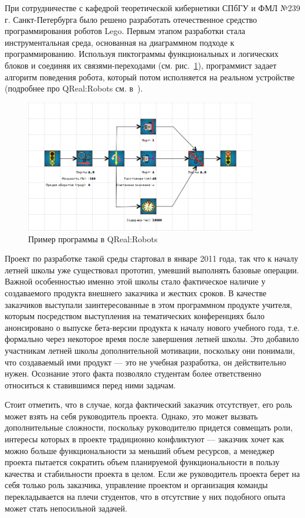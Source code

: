 \documentclass[a4paper]{article}
\begin{document}
При сотрудничестве с кафедрой теоретической кибернетики СПбГУ и ФМЛ №239 г. Санкт-Петербурга было решено разработать отечественное средство программирования роботов Lego. Первым этапом разработки стала инструментальная среда, основанная на диаграммном подходе к программированию. Используя пиктограммы функциональных и логических блоков и соединяя их связями-переходами (см. рис.~\ref{qreal-robots}), программист задает алгоритм поведения робота, который потом исполняется на реальном устройстве (подробнее про QReal:Robots см. в~\cite{robots}).

\begin{figure} [ht]
  \begin{center}
    \includegraphics[width=0.9\textwidth]{02-qreal-robots.png}
    \caption{Пример программы в QReal:Robots}
    \label{qreal-robots}
  \end{center}
\end{figure}

Проект по разработке такой среды стартовал в январе 2011 года, так что к началу летней школы уже существовал прототип, умевший выполнять базовые операции. Важной особенностью именно этой школы стало фактическое наличие у создаваемого продукта внешнего заказчика и жестких сроков. В качестве заказчиков выступали заинтересованные в этом программном продукте учителя, которым посредством выступления на тематических конференциях было анонсировано о выпуске бета-версии продукта к началу нового учебного года, т.е. формально через некоторое время после завершения летней школы. Это добавило участникам летней школы дополнительной мотивации, поскольку они понимали, что создаваемый ими продукт --- это не учебная разработка, он действительно нужен. Осознание этого факта позволяло студентам более ответственно относиться к ставившимся перед ними задачам. 

Стоит отметить, что в случае, когда фактический заказчик отсутствует, его роль может взять на себя руководитель проекта. Однако, это может вызвать дополнительные сложности, поскольку руководителю придется совмещать роли, интересы которых в проекте традиционно конфликтуют --- заказчик хочет как можно больше функциональности за меньший объем ресурсов, а менеджер проекта пытается сократить объем планируемой функциональности в пользу качества и стабильности проекта в целом. Если же руководитель проекта берет на себя только роль заказчика, управление проектом и организация команды перекладывается на плечи студентов, что в отсутствие у них подобного опыта может стать непосильной задачей.
\end{document}
